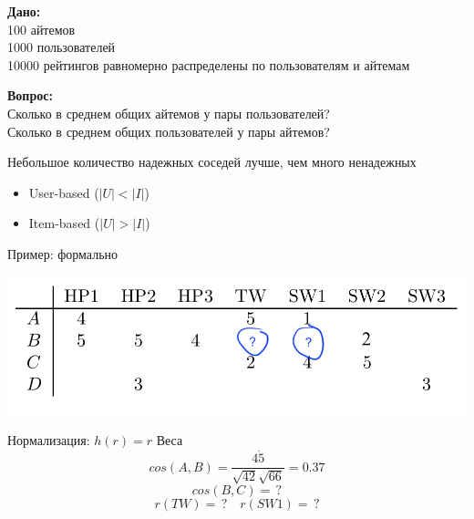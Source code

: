 \documentclass[11pt,aspectratio=169,handout=true]{beamer}
\begin{document}
\begin{frame}

{\bf Дано:} \\
100 айтемов \\
1000 пользователей \\
10000 рейтингов равномерно распределены по пользователям и айтемам \\

\vfill

{\bf Вопрос:} \\
Сколько в среднем общих айтемов у пары пользователей? \\
Сколько в среднем общих пользователей у пары айтемов? \\

\vfill

\begin{tcolorbox}[colback=gray!5,colframe=gray!80,title=]
Небольшое количество надежных соседей лучше, чем много ненадежных
\begin{itemize}
\item User-based ($|U| < |I|$)
\item Item-based  ($|U| > |I|$)
\end{itemize}
\end{tcolorbox}

\end{frame}

\begin{frame}{Пример: формально}

\begin{center}
\includegraphics[scale=0.5]{images/utility.png}
\end{center}

Нормализация: $h(r) = r$
Веса
\[
cos(A, B) = \frac{4 \dot 5}{ \sqrt{42} \sqrt{66} } = 0.37
\]
\[
cos(B, C) = \, ? 
\]
\[
r(TW) = \, ? \quad r(SW1) = \, ?
\]

\end{frame}
\end{document}

